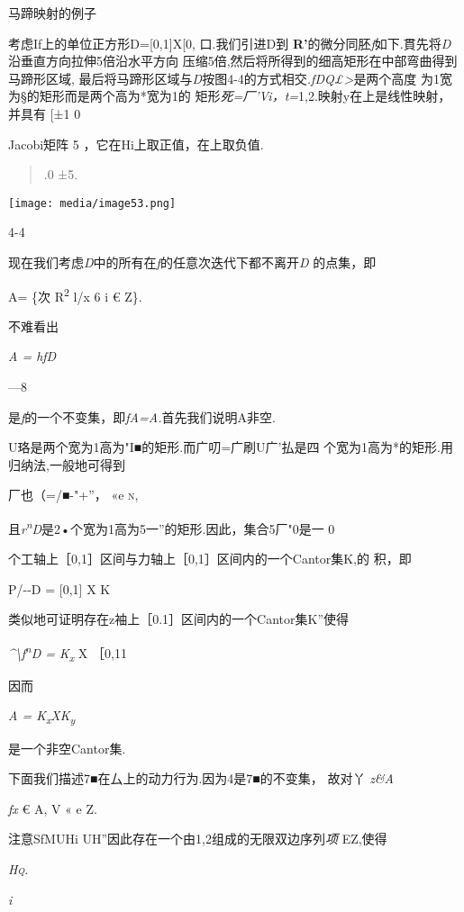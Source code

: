 \documentclass{article}
\begin{document}
马蹄映射的例子

考虑If上的单位正方形D={[}0,1{]}X{[}0, 口.我们引进D到
\textbf{R'}的微分同胚\emph{f}如下.貫先将\emph{D}沿垂直方向拉伸5倍沿水平方向
压缩5倍,然后将所得到的细高矩形在中部弯曲得到马蹄形区域,
最后将马蹄形区域与\emph{D}按图4-4的方式相交\emph{.fDQ£\textgreater{}}是两个高度
为1宽为§的矩形而是两个高为*宽为1的
矩形\emph{死=厂'Vi，t=}1,2.映射y在上是线性映射，并具有 {[}±1 0

Jacobi矩阵 5 ，它在Hi上取正值，在上取负值.

\begin{quote}
.0 ±5.
\end{quote}

\texttt{[image: media/image53.png]}

4-4

现在我们考虑\emph{D}中的所有在\emph{f}的任意次迭代下都不离开\emph{D}
的点集，即

A= \{次 R\textsuperscript{2} l/x 6 i € Z\}.

不难看出

\emph{A = hfD}

---8

是\emph{f}的一个不变集，即\emph{fA=A.}首先我们说明A非空.

U珞是两个宽为1高为"I■的矩形.而广叨=广\textbar{}刷U广'払是四
个宽为1高为*的矩形.用归纳法,一般地可得到

厂也（=/■-"+''， «e \textsc{n,}

且\emph{r\textsuperscript{n}D}是2•个宽为1高为5一''的矩形.因此，集合5厂"0是一
0

个工轴上［0,1］区间与力轴上［0,1］区间内的一个Cantor集K,的 积，即

P/-\/-D = {[}0,1{]} X K

类似地可证明存在z袖上［0.1］区间内的一个Cantor集K''使得

\emph{\^{}\textbackslash{}f\textsuperscript{n}D = K\textsubscript{x}} X
［0,11

因而

\emph{A = K\textsubscript{x}XK\textsubscript{y}}

是一个非空Cantor集.

下面我们描述7■在厶上的动力行为.因为4是7■的不变集， 故对丫 \emph{z\&A}

\emph{fx} € A, V « e Z.

注意SfMUHi UH''因此存在一个由1,2组成的无限双边序列\emph{项} EZ,使得

\emph{\textsc{Hq.}}

\emph{i}
\end{document}
